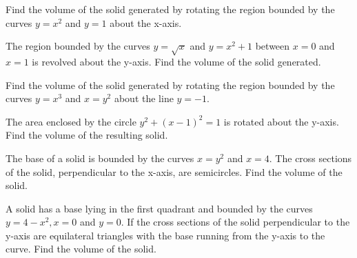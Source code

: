 \documentclass[
  course = {{MATH102 Calculus II}},
  quartile = {{2}},
  assignment = 7 - Wednesday,%
  topic = {{6.2: Volumes (Method of Cross-Sections)}},
  firstexercise = 1,
  term = 202
]{aga-homework}
\begin{document}
\newpage

\problem Find the volume of the solid generated by rotating the region bounded by the curves $y=x^2$  and $y=1$ about the x-axis. 

\newpage

\problem The region bounded by the curves $y =\sqrt{x}$ and $y = x^2 + 1$ between $x = 0$ and $x = 1$
is revolved about the y-axis. Find the volume of the solid generated.

\newpage


\problem Find the volume of the solid generated by rotating the region bounded by the curves $y=x^3$ and $x=y^2$ about the line 
$y=-1$.

\newpage


\problem The area enclosed by the circle $y^2 + (x -1)^2 = 1$ is rotated about the y-axis. Find the volume of the resulting solid.

\newpage



\problem The base of a solid is bounded by the curves $x = y^2$ and $x=4$. The cross sections of the solid, perpendicular to
the x-axis, are semicircles. Find the volume of the solid.

\newpage


\problem A solid has a base lying in the first quadrant and bounded by the curves $y =4 - x^2, x = 0$ and $y = 0$. If the cross sections of the solid perpendicular to the y-axis are equilateral triangles with the base running from the y-axis to the curve. Find the volume of the solid.

\afterpage{\null\newpage}

\afterpage{\null\newpage}

\afterpage{\null\newpage}
\end{document}
